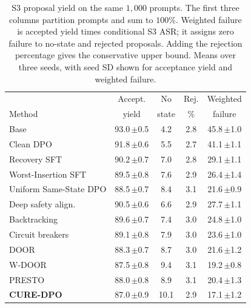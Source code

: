 \documentclass[11pt]{article}
\newcommand{\method}{CURE-DPO}
\newcommand{\asr}{ASR}
\begin{document}
\begin{table}[t]
  \centering
  \footnotesize
  \setlength{\tabcolsep}{2.5pt}
  \begin{tabular}{@{}lcccc@{}}
    \toprule
    & Accept. & No & Rej. & Weighted \\
    Method & yield & state & \% & failure \\
    \midrule
    Base                   & 93.0\,{\scriptsize$\pm$0.5} & 4.2 & 2.8 & 45.8\,{\scriptsize$\pm$1.0} \\
    Clean DPO              & 91.8\,{\scriptsize$\pm$0.6} & 5.5 & 2.7 & 41.1\,{\scriptsize$\pm$1.1} \\
    Recovery SFT           & 90.2\,{\scriptsize$\pm$0.7} & 7.0 & 2.8 & 29.1\,{\scriptsize$\pm$1.1} \\
    Worst-Insertion SFT    & 89.5\,{\scriptsize$\pm$0.8} & 7.6 & 2.9 & 26.4\,{\scriptsize$\pm$1.4} \\
    Uniform Same-State DPO & 88.5\,{\scriptsize$\pm$0.7} & 8.4 & 3.1 & 21.6\,{\scriptsize$\pm$0.9} \\
    \midrule
    Deep safety align.     & 90.5\,{\scriptsize$\pm$0.6} & 6.6 & 2.9 & 27.7\,{\scriptsize$\pm$1.1} \\
    Backtracking           & 89.6\,{\scriptsize$\pm$0.7} & 7.4 & 3.0 & 24.8\,{\scriptsize$\pm$1.0} \\
    Circuit breakers       & 89.1\,{\scriptsize$\pm$0.8} & 7.9 & 3.0 & 23.6\,{\scriptsize$\pm$1.0} \\
    DOOR                   & 88.3\,{\scriptsize$\pm$0.7} & 8.7 & 3.0 & 21.6\,{\scriptsize$\pm$1.2} \\
    W-DOOR                 & 87.5\,{\scriptsize$\pm$0.8} & 9.4 & 3.1 & 19.2\,{\scriptsize$\pm$0.8} \\
    PRESTO                 & 88.0\,{\scriptsize$\pm$0.8} & 8.9 & 3.1 & 20.4\,{\scriptsize$\pm$1.3} \\
    \midrule
    \textbf{\method{}}     & 87.0\,{\scriptsize$\pm$0.9} & 10.1 & 2.9 & 17.1\,{\scriptsize$\pm$1.2} \\
    \bottomrule
  \end{tabular}
  \caption{S3 proposal yield on the same \(1{,}000\) prompts. The first three
  columns partition prompts and sum to \(100\)\%. Weighted failure is accepted
  yield times conditional S3 \asr{}; it assigns zero failure to no-state and
  rejected proposals. Adding the rejection percentage gives the conservative
  upper bound. Means over three seeds, with seed SD shown for acceptance yield
  and weighted failure.}
  \label{tab:s3-yield}
\end{table}
\end{document}
